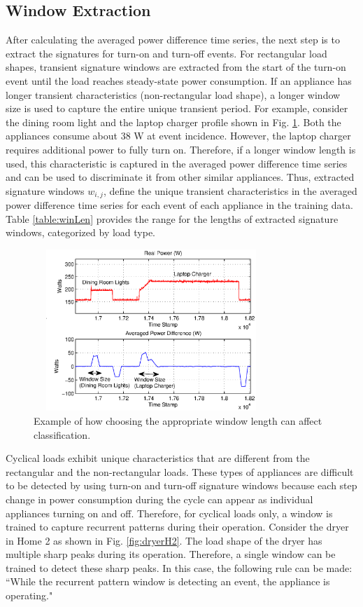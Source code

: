 \documentclass[conference]{IEEEtran}
\begin{document}
\subsection{Window Extraction}
After calculating the averaged power difference time series, the next step is to extract the signatures for turn-on  and turn-off events.  For rectangular load shapes, transient signature windows are extracted from the start of the turn-on event until the load reaches steady-state power consumption.  If an appliance has longer transient characteristics (non-rectangular load shape), a longer window size is used to capture the entire unique transient period.  For example, consider the dining room light and the laptop charger profile shown in Fig. \ref{fig:windowlength}.  Both the appliances consume about 38 W at event incidence.  However, the laptop charger requires additional power to fully turn on.  Therefore, if a longer window length is used, this characteristic is captured in the averaged power difference time series and can be used to discriminate it from other similar appliances. Thus, extracted signature windows $w_{i,j}$, define the unique transient characteristics in the averaged power difference time series for each event of each appliance in the training data.  Table \ref{table:winLen} provides the range for the lengths of extracted signature windows, categorized by load type.

\begin{figure}[!t]
	\centering
	\includegraphics[height = 2.4in, width=3.5in]{fig/windowlength.eps}
	\caption{Example of how choosing the appropriate window length can affect classification.}
	\label{fig:windowlength}
\end{figure}

Cyclical loads exhibit unique characteristics that are different from the rectangular and the non-rectangular loads.  These types of appliances are difficult to be detected by using turn-on and turn-off signature windows because each step change in power consumption during the cycle can appear as individual appliances turning on and off. Therefore, for cyclical loads only, a window is trained to capture recurrent patterns during their operation.  Consider the dryer in Home 2 as shown in Fig. \ref{fig:dryerH2}.  The load shape of the dryer has multiple sharp peaks during its operation.  Therefore, a single window can be trained to detect these sharp peaks.  In this case, the following rule can be made:  ``While the recurrent pattern window is detecting an event, the appliance is operating."  
\end{document}
